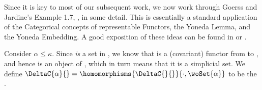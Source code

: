    

Since it is key to most of our subsequent work, we now work through Goerss and Jardine's 
Example 1.7, \cite[page 6]{goerssJardin1999SimplicialHomotopyTh}, in some detail.  This is 
essentially a standard application of the Categorical concepts of representable Functors, 
the Yoneda Lemma, and the Yoneda Embedding.  A good exposition of these ideas can be found 
in \cite[Section 4.5]{barrWells1995catTh} or \cite[Chapter 8]{awodey2006catTh}.  

Consider $\alpha \leq \kappa$.  Since \woSet{\alpha} \emph{is} a set in \setC{}, we know 
that \homomorphisms{\DeltaC{}{}}{\cdot, \woSet{\alpha}} is a (covariant) functor from 
\opposite{\DeltaC{}{}} to \setC{}, and hence is an object of 
\opFuncCat{\DeltaC{}{}}{\setC{}}, which in turn means that it is a simplicial set. We define 
$\DeltaC{\alpha}{} = \homomorphisms{\DeltaC{}{}}{\cdot, \woSet{\alpha}}$ to be the 
. 

